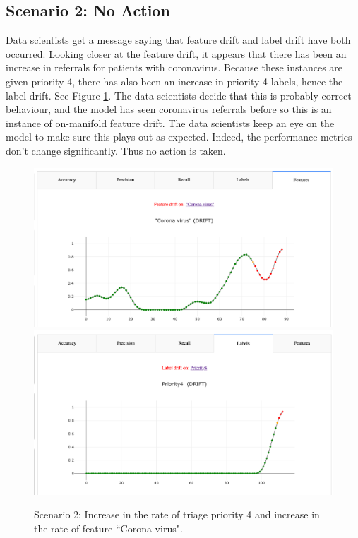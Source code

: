 \subsection{Scenario 2: No Action}

Data scientists get a message saying that feature drift and label drift have both occurred. Looking closer at the feature drift, it appears that there has been an increase in referrals for patients with coronavirus. Because these instances are given priority 4, there has also been an increase in priority 4 labels, hence the label drift. See Figure \ref{fig:scenario2}. The data scientists decide that this is probably correct behaviour, and the model has seen coronavirus referrals before so this is an instance of on-manifold feature drift. 
The data scientists keep an eye on the model to make sure this plays out as expected. Indeed, the performance metrics don't change significantly. Thus no action is taken.

\begin{figure}
    \centering
    \includegraphics[width=\textwidth]{images/corona_virus.png}
    \includegraphics[width=\textwidth]{images/priority4.png}
    \caption{Scenario 2: Increase in the rate of triage priority 4 and increase in the rate of feature ``Corona virus".}
    \label{fig:scenario2}
\end{figure}


